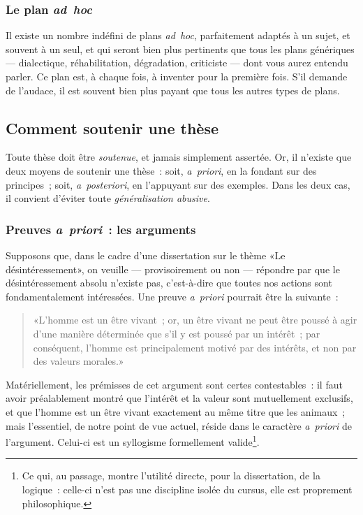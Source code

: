 \documentclass[a4paper,11pt]{article}
\newcommand{\cad}{c'est-à-dire}
\newcommand{\apr}{\emph{a~priori}}
\newcommand{\apost}{\emph{a~posteriori}}
\begin{document}
\subsubsection{Le plan \emph{ad~hoc}}

Il existe un nombre indéfini de plans \emph{ad~hoc}, parfaitement
adaptés à un sujet, et souvent à un seul, et qui seront bien plus
pertinents que tous les plans génériques --- dialectique,
réhabilitation, dégradation, criticiste --- dont vous aurez entendu
parler. Ce plan est, à chaque fois, à inventer pour la première
fois. S'il demande de l'audace, il est souvent bien plus payant que tous
les autres types de plans.



\subsection{Comment soutenir une thèse}

Toute thèse doit être \emph{soutenue}, et jamais simplement
assertée. Or, il n'existe que deux moyens de soutenir une thèse~: soit,
\apr{}, en la fondant sur des principes~; soit, \apost{}, en l'appuyant
sur des exemples. Dans les deux cas, il convient d'éviter toute
\emph{généralisation abusive}.


\subsubsection{Preuves \apr{}~: les arguments}

Supposons que, dans le cadre d'une dissertation sur le thème «Le
désintéressement», on veuille --- provisoirement ou non --- répondre par
que le désintéressement absolu n'existe pas, \cad{} que toutes nos
actions sont fondamentalement intéressées. Une preuve \apr{} pourrait
être la suivante~:
\begin{quote}
  «L'homme est un être vivant~; or, un être vivant ne peut être poussé à
  agir d'une manière déterminée que s'il y est poussé par un intérêt~;
  par conséquent, l'homme est principalement motivé par des intérêts, et
  non par des valeurs morales.»
\end{quote}
Matériellement, les prémisses de cet argument sont certes contestables~:
il faut avoir préalablement montré que l'intérêt et la valeur sont
mutuellement exclusifs, et que l'homme est un être vivant exactement au
même titre que les animaux~; mais l'essentiel, de notre point de vue
actuel, réside dans le caractère \apr{} de l'argument. Celui-ci est un
syllogisme formellement valide\footnote{Ce qui, au passage, montre
  l'utilité directe, pour la dissertation, de la logique~: celle-ci
  n'est pas une discipline isolée du cursus, elle est proprement
  philosophique.}.
\end{document}
